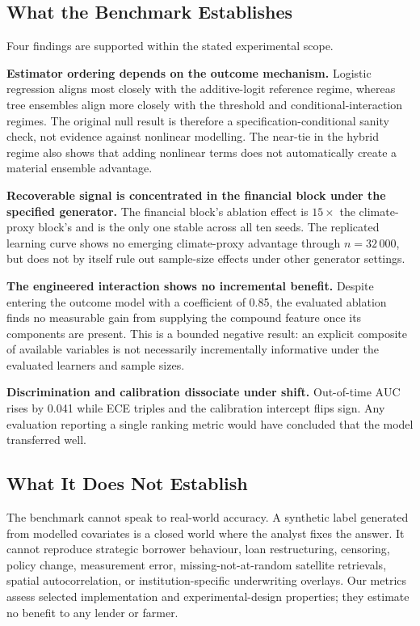\documentclass[journal]{IEEEtran}
\newcommand{\auc}{\mbox{AUC}}
\begin{document}
\subsection{What the Benchmark Establishes}
Four findings are supported within the stated experimental scope.

\textbf{Estimator ordering depends on the outcome mechanism.} Logistic regression aligns most closely with the additive-logit reference regime, whereas tree ensembles align more closely with the threshold and conditional-interaction regimes. The original null result is therefore a specification-conditional sanity check, not evidence against nonlinear modelling. The near-tie in the hybrid regime also shows that adding nonlinear terms does not automatically create a material ensemble advantage.

\textbf{Recoverable signal is concentrated in the financial block under the specified generator.} The financial block's ablation effect is $15\times$ the climate-proxy block's and is the only one stable across all ten seeds. The replicated learning curve shows no emerging climate-proxy advantage through $n=32\,000$, but does not by itself rule out sample-size effects under other generator settings.

\textbf{The engineered interaction shows no incremental benefit.} Despite entering the outcome model with a coefficient of 0.85, the evaluated ablation finds no measurable gain from supplying the compound feature once its components are present. This is a bounded negative result: an explicit composite of available variables is not necessarily incrementally informative under the evaluated learners and sample sizes.

\textbf{Discrimination and calibration dissociate under shift.} Out-of-time $\auc$ rises by 0.041 while ECE triples and the calibration intercept flips sign. Any evaluation reporting a single ranking metric would have concluded that the model transferred well.

\subsection{What It Does Not Establish}
The benchmark cannot speak to real-world accuracy. A synthetic label generated from modelled covariates is a closed world where the analyst fixes the answer. It cannot reproduce strategic borrower behaviour, loan restructuring, censoring, policy change, measurement error, missing-not-at-random satellite retrievals, spatial autocorrelation, or institution-specific underwriting overlays. Our metrics assess selected implementation and experimental-design properties; they estimate no benefit to any lender or farmer.
\end{document}
